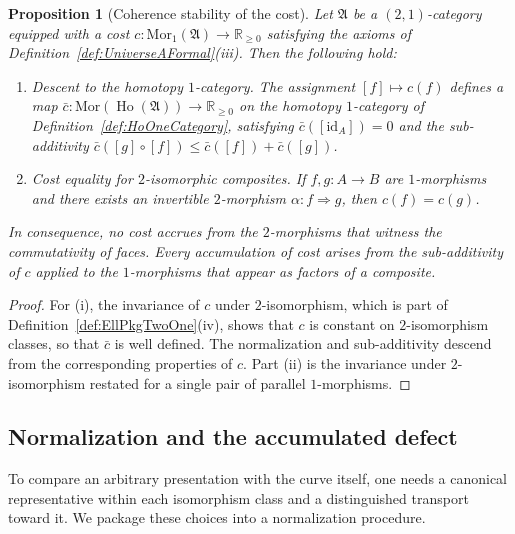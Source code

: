 \documentclass[10pt, reqno]{amsart}
\theoremstyle{plain}
\newtheorem{proposition}[theorem]{Proposition}
\theoremstyle{definition}
\theoremstyle{plain}
\newcommand{\R}{\mathbb{R}}
\newcommand{\Ho}{\operatorname{Ho}}
\begin{document}
\begin{proposition}[Coherence stability of the cost]\label{prop:CoherenceStability}
Let $\mathfrak{A}$ be a $(2,1)$-category equipped with a cost $c \colon \mathrm{Mor}_1(\mathfrak{A}) \to \R_{\ge 0}$ satisfying the axioms of Definition~\ref{def:UniverseAFormal}\textup{(iii)}. Then the following hold:
\begin{enumerate}
\item[\textup{(i)}] \textit{Descent to the homotopy $1$-category.} The assignment $[f] \mapsto c(f)$ defines a map $\bar{c} \colon \mathrm{Mor}(\Ho(\mathfrak{A})) \to \R_{\ge 0}$ on the homotopy $1$-category of Definition~\ref{def:HoOneCategory}, satisfying $\bar{c}([\mathrm{id}_A]) = 0$ and the sub-additivity $\bar{c}([g]\circ[f]) \le \bar{c}([f]) + \bar{c}([g])$.
\item[\textup{(ii)}] \textit{Cost equality for $2$-isomorphic composites.} If $f, g \colon A \to B$ are $1$-morphisms and there exists an invertible $2$-morphism $\alpha \colon f \Rightarrow g$, then $c(f) = c(g)$.
\end{enumerate}
In consequence, no cost accrues from the $2$-morphisms that witness the commutativity of faces. Every accumulation of cost arises from the sub-additivity of $c$ applied to the $1$-morphisms that appear as factors of a composite.
\end{proposition}

\begin{proof}
For \textup{(i)}, the invariance of $c$ under $2$-isomorphism, which is part of Definition~\ref{def:EllPkgTwoOne}\textup{(iv)}, shows that $c$ is constant on $2$-isomorphism classes, so that $\bar{c}$ is well defined. The normalization and sub-additivity descend from the corresponding properties of $c$. Part \textup{(ii)} is the invariance under $2$-isomorphism restated for a single pair of parallel $1$-morphisms.
\end{proof}

\subsection{Normalization and the accumulated defect}\label{subsec:Normalization}

To compare an arbitrary presentation with the curve itself, one needs a canonical representative within each isomorphism class and a distinguished transport toward it. We package these choices into a normalization procedure.
\end{document}
